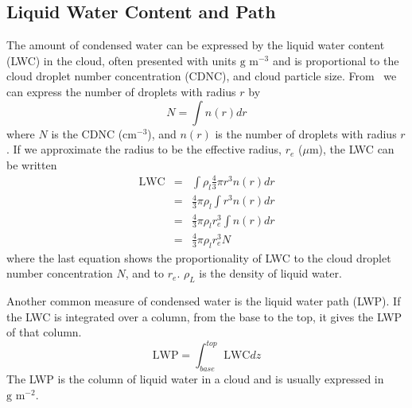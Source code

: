 
\subsection{Liquid Water Content and Path}
The amount of condensed water can be expressed by the liquid water content (LWC) in the cloud, often presented with units $\text{g~m}^{-3}$ and is proportional to the cloud droplet number concentration (CDNC), and cloud particle size. From~\citet{Rogers1989} we can express the number of droplets with radius $r$ by
\begin{equation}
N = \int n(r) dr
\end{equation}
where $N$ is the CDNC ($\text{cm}^{-3}$), and $n(r)$ is the number of droplets with radius $r$. If we approximate the radius to be the effective radius, $r_e$ ($\mu\text{m}$), the LWC can be written
\begin{eqnarray}
\text{LWC} &=& \int \rho_l \frac{4}{3} \pi r^3 n(r) dr\\
&=& \frac{4}{3} \pi \rho_l \int r^3 n(r) dr\\
&=& \frac{4}{3} \pi \rho_l r_e^3 \int n(r) dr\\
&=& \frac{4}{3} \pi \rho_l r_e^3 N 
\label{eqn:LWC}
\end{eqnarray}
where the last equation shows the proportionality of LWC to the cloud droplet number concentration $N$, and to $r_e$. $\rho_L$ is the density of liquid water.

Another common measure of condensed water is the liquid water path (LWP).
If the LWC is integrated over a column, from the base to the top, it gives the LWP of that column.
\begin{equation}
\text{LWP} = \int_{base}^{top} \text{LWC} dz
\end{equation}
The LWP is the column of liquid water in a cloud and is usually expressed in $\text{g~m}^{-2}$.

